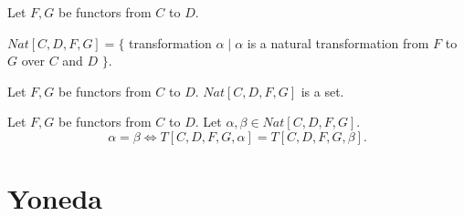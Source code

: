 \documentclass{article}
\begin{document}
\begin{forthel}
		\begin{definition} 
			Let $F,G$ be functors from $C$ to $D$. 
			\begin{center}
			$Nat[C,D,F,G] = \{$ transformation $\alpha \mid \alpha$ is a natural transformation from $F$ to $G$ over $C$ and $D$ $\}$.
			\end{center}
			
		\end{definition}
		
		\begin{axiom} Let $F,G$ be functors from $C$ to $D$. $Nat[C,D,F,G]$ is a set.
		\end{axiom}
		

		
		\begin{axiom}
			Let $F,G$ be functors from $C$ to $D$. Let $\alpha, \beta \in Nat[C,D,F,G]$.
			$$\alpha = \beta \iff T[C,D,F,G,\alpha] = T[C,D,F,G,\beta].$$
		\end{axiom}


		
	\end{forthel}

	
	\section{Yoneda}
\end{document}
